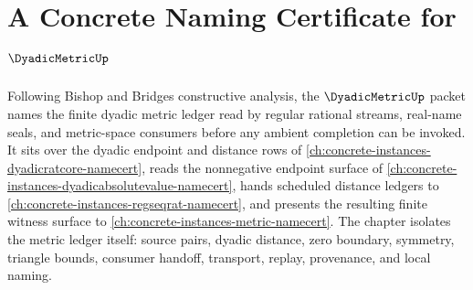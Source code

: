 \chapter{A Concrete Naming Certificate for $\DyadicMetricUp$}
\label{ch:concrete-instances-dyadic-metric-namecert}

Following Bishop and Bridges constructive analysis, the $\DyadicMetricUp$ packet names the finite dyadic metric ledger read by regular rational streams, real-name seals, and metric-space consumers before any ambient completion can be invoked. It sits over the dyadic endpoint and distance rows of \autoref{ch:concrete-instances-dyadicratcore-namecert}, reads the nonnegative endpoint surface of \autoref{ch:concrete-instances-dyadicabsolutevalue-namecert}, hands scheduled distance ledgers to \autoref{ch:concrete-instances-regseqrat-namecert}, and presents the resulting finite witness surface to \autoref{ch:concrete-instances-metric-namecert}. The chapter isolates the metric ledger itself: source pairs, dyadic distance, zero boundary, symmetry, triangle bounds, consumer handoff, transport, replay, provenance, and local naming.

